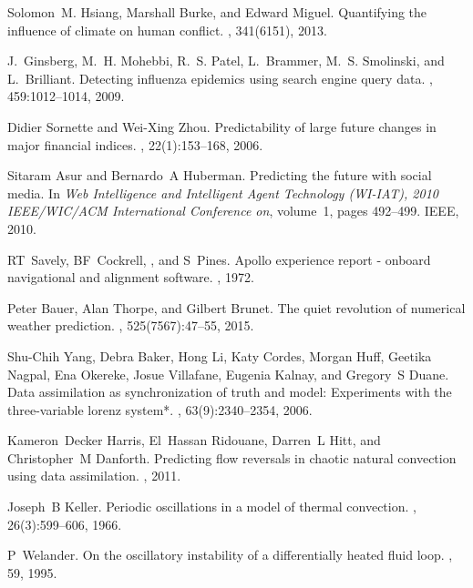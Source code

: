 \documentclass[pre,twocolumn,twoside,byrevtex,superscriptaddress]{revtex4}
\begin{document}

\begin{thebibliography}{10}

Solomon~M. Hsiang, Marshall Burke, and Edward Miguel.
\newblock Quantifying the influence of climate on human conflict.
, 341(6151), 2013.

J.~Ginsberg, M.~H. Mohebbi, R.~S. Patel, L.~Brammer, M.~S. Smolinski, and
  L.~Brilliant.
\newblock Detecting influenza epidemics using search engine query data.
, 459:1012--1014, 2009.

Didier Sornette and Wei-Xing Zhou.
\newblock Predictability of large future changes in major financial indices.
, 22(1):153--168, 2006.

Sitaram Asur and Bernardo~A Huberman.
\newblock Predicting the future with social media.
\newblock In {\em Web Intelligence and Intelligent Agent Technology (WI-IAT),
  2010 IEEE/WIC/ACM International Conference on}, volume~1, pages 492--499.
  IEEE, 2010.

RT~Savely, BF~Cockrell, , and S~Pines.
\newblock Apollo experience report - onboard navigational and alignment
  software.
, 1972.

Peter Bauer, Alan Thorpe, and Gilbert Brunet.
\newblock The quiet revolution of numerical weather prediction.
, 525(7567):47--55, 2015.

Shu-Chih Yang, Debra Baker, Hong Li, Katy Cordes, Morgan Huff, Geetika Nagpal,
  Ena Okereke, Josue Villafane, Eugenia Kalnay, and Gregory~S Duane.
\newblock Data assimilation as synchronization of truth and model: Experiments
  with the three-variable lorenz system*.
, 63(9):2340--2354, 2006.

Kameron~Decker Harris, El~Hassan Ridouane, Darren~L Hitt, and Christopher~M
  Danforth.
\newblock Predicting flow reversals in chaotic natural convection using data
  assimilation.
, 2011.

Joseph~B Keller.
\newblock Periodic oscillations in a model of thermal convection.
, 26(3):599--606, 1966.

P~Welander.
\newblock On the oscillatory instability of a differentially heated fluid loop.
, 59, 1995.


\end{thebibliography}
\end{document}
